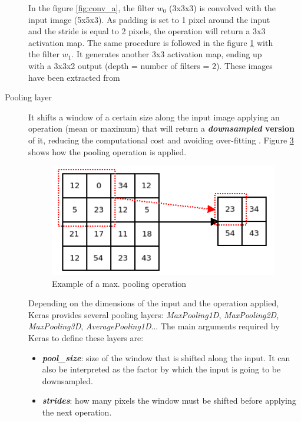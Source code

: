 \begin{description}
\begin{figure}
\begin{subfigure}{0.625\textwidth}
			\caption{}\label{fig:conv_b}
		\end{subfigure}
		\caption[Convolutional layer]{In the figure \ref{fig:conv_a}, the filter $w_0$ (3x3x3) is convolved with the input image (5x5x3). As padding is set to 1 pixel around the input and the stride is equal to 2 pixels, the operation will return a 3x3 activation map. The same procedure is followed in the figure \ref{fig:conv_b} with the filter $w_1$. It generates another 3x3 activation map, ending up with a 3x3x2 output (depth = number of filters = 2). These images have been extracted from \cite{cs231n}}
		\label{fig:convlayer}
	\end{figure}
	
\end{description}

\begin{description}
	\item[{Pooling layer}] It shifts a window of a certain size along the input image applying an operation (mean or maximum) that will return a \textbf{\textit{downsampled} version} of it, reducing the computational cost and avoiding over-fitting \cite{Scherer2010Evaluation}. Figure \ref{fig:pooling} shows how the pooling operation is applied.

	\begin{figure}
		\centering
		\includegraphics[width=10cm, keepaspectratio]{figures/pooling.png}
		\caption{Example of a max. pooling operation}
		\label{fig:pooling}
	\end{figure}
	
	Depending on the dimensions of the input and the operation applied, Keras provides several pooling layers: \textit{MaxPooling1D}, \textit{MaxPooling2D}, \textit{MaxPooling3D}, \textit{AveragePooling1D}... The main arguments required by Keras to define these layers are:
	\begin{itemize}
		\item \textbf{\textit{pool\_size}}: size of the window that is shifted along the input. It can also be interpreted as the factor by which the input is going to be downsampled.
		\item \textbf{\textit{strides}}: how many pixels the window must be shifted before applying the next operation.
	\end{itemize}
\end{description}

